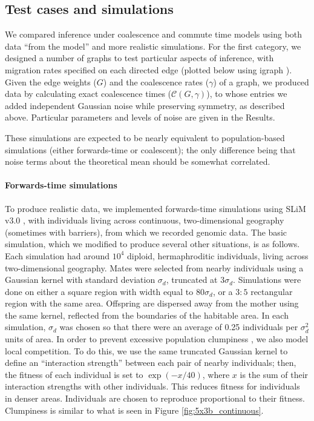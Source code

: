 \documentclass{article}
\begin{document}
\subsection*{Test cases and simulations}

We compared inference under coalescence and commute time models
using both data ``from the model'' and more realistic simulations.
For the first category, we designed a number of graphs to test particular aspects of inference,
with migration rates specified on each directed edge
(plotted below using igraph \citep{igraph}).
Given the edge weights ($G$) and the coalescence rates ($\gamma$) of a graph,
we produced data by calculating exact coalescence times ($\mathcal{C}(G,\gamma)$),
to whose entries we added independent Gaussian noise while preserving symmetry,
as described above.
Particular parameters and levels of noise are given in the Results.

These simulations are expected to be nearly equivalent to population-based simulations
(either forwards-time or coalescent);
the only difference being that noise terms about the theoretical mean should be somewhat correlated.

\paragraph{Forwards-time simulations}
To produce realistic data, we implemented forwards-time simulations using SLiM v3.0 \citep{haller2017slim,haller2018treesequences},
with individuals living across continuous, two-dimensional geography (sometimes with barriers),
from which we recorded genomic data.
The basic simulation, which we modified to produce several other situations,
is as follows.
Each simulation had around $10^4$ diploid, hermaphroditic individuals, 
living across two-dimensional geography.
Mates were selected from nearby individuals using a Gaussian kernel with standard deviation $\sigma_d$,
truncated at $3 \sigma_d$.
Simulations were done on either a square region with width equal to $80\sigma_d$,
or a $3:5$ rectangular region with the same area.
Offspring are dispersed away from the mother using the same kernel,
reflected from the boundaries of the habitable area.
In each simulation, $\sigma_d$ was chosen 
so that there were an average of 0.25 individuals per $\sigma_d^2$ units of area.
In order to prevent excessive population clumpiness \citep{felsensten1975pain}, 
we also model local competition. 
To do this, we use the same truncated Gaussian kernel to define an ``interaction strength''
between each pair of nearby individuals;
then, the fitness of each individual is set to $\exp(-x/40)$, 
where $x$ is the sum of their interaction strengths with other individuals.
This reduces fitness for individuals in denser areas.
Individuals are chosen to reproduce proportional to their fitness.
Clumpiness is similar to what is seen in 
Figure \ref{fig:5x3b_continuous}.
\end{document}
